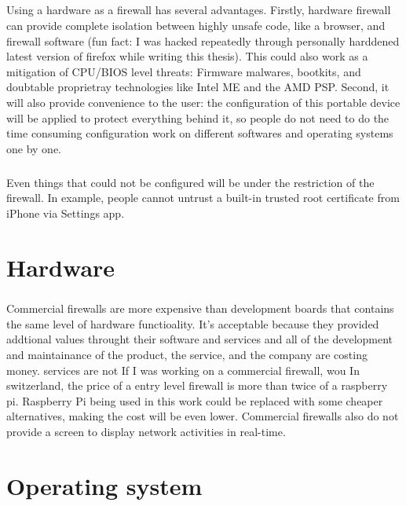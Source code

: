 \documentclass[mscthesis]{usiinfthesis}
\begin{document}
\paragraph{}
Using a hardware as a firewall has several advantages. Firstly, hardware
firewall can provide complete isolation between highly unsafe code,
like a browser, and firewall software (fun fact: I was hacked repeatedly
through personally harddened latest version of firefox while writing this
thesis). This could also work as a mitigation of CPU/BIOS level threats:
Firmware malwares, bootkits, and doubtable proprietray technologies like
Intel ME and the AMD PSP. Second, it will also provide convenience to the
user: the configuration of this portable device will be applied to protect
everything behind it, so people do not need to do the time consuming
configuration work on different softwares and operating systems one by one.
\paragraph{}
Even things that could not be configured will be under the restriction of the firewall. In example, people cannot untrust a built-in trusted root certificate from iPhone via Settings app.

\chapter{Hardware}
\paragraph{}
Commercial firewalls are more expensive than development boards that contains the same level of hardware functioality. It's acceptable because they provided addtional values throught their software and services and all of the development and maintainance of the product, the service, and the company are costing money. services are not
If I was working on a commercial firewall,  wou
In switzerland, the price of a entry
level firewall is more than twice of a raspberry pi. Raspberry Pi being
used in this work could be replaced with some cheaper alternatives, making
the cost will be even lower. Commercial firewalls also do not provide a
screen to display network activities in real-time.

\chapter{Operating system}
\end{document}
